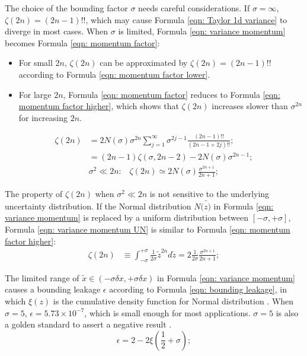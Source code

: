 \documentclass[twoside]{article}
\numberwithin{equation}{section}
\newcommand{\eqspace}{\;\;\;}
\begin{document}
The choice of the bounding factor $\sigma$ needs careful considerations.
If $\sigma = \infty$, $\zeta(2n) = (2n - 1)!!$, which may cause Formula \eqref{eqn: Taylor 1d variance} to diverge in most cases.
When $\sigma$ is limited, Formula \eqref{eqn: variance momentum} becomes Formula \eqref{eqn: momentum factor}:
\begin{itemize}
\item For small $2n$, $\zeta(2n)$ can be approximated by $\zeta(2n) = (2n-1)!!$ according to Formula \eqref{eqn: momentum factor lower}.  

\item For large $2n$, Formula \eqref{eqn: momentum factor} reduces to Formula \eqref{eqn: momentum factor higher}, which shows that $\zeta(2n)$ increases slower than $\sigma^{2n}$ for increasing $2n$.

\end{itemize}
\begin{align}
\label{eqn: momentum factor} 
\zeta(2n) &= 2 N(\sigma) \sigma^{2n} \sum_{j=1}^{\infty} \sigma^{2j-1} \frac{(2n - 1)!!}{(2n-1 + 2j)!!}; \\
\label{eqn: momentum factor lower} 
 &= (2n - 1) \zeta(\sigma, 2n - 2) - 2 N(\sigma) \sigma^{2n - 1}; \\
\label{eqn: momentum factor higher} 
&\sigma^2 \ll 2n:\eqspace \zeta(2n) \simeq 2 N(\sigma) \frac{\sigma^{2n+1}}{2n+1};
\end{align}

The property of $\zeta(2n)$ when $\sigma^2 \ll 2n$ is not sensitive to the underlying uncertainty distribution.  If the Normal distribution $N(\tilde{z)}$ in Formula \eqref{eqn: variance momentum} is replaced by a uniform distribution between $[-\sigma, +\sigma]$,  Formula \eqref{eqn: variance momentum UN} is similar to Formula \eqref{eqn: momentum factor higher}:
\begin{align}
\label{eqn: variance momentum UN}
\zeta(2n) &\equiv \int_{-\sigma}^{+\sigma} \frac{1}{2 \sigma} \tilde{z}^{2n} d \tilde{z} = 2 \frac{1}{2 \sigma} \frac{{\sigma}^{2n+1}}{2n + 1}; 
\end{align}

The limited range of $\tilde{x} \in (-\sigma \delta x, +\sigma \delta x)$ in Formula \eqref{eqn: variance momentum} causes a bounding leakage $\epsilon$ according to Formula \eqref{eqn: bounding leakage}, in which $\xi(z)$ is the cumulative density function for Normal distribution \cite{Probability_Statistics}.
When $\sigma = 5$, $\epsilon = 5.73 \times 10^{-7}$, which is small enough for most applications.
$\sigma = 5$ is also a golden standard to assert a negative result \cite{Precisions_Physical_Measurements}.
\begin{equation}
\label{eqn: bounding leakage}
\epsilon = 2 - 2 \xi(\frac{1}{2} + \sigma);
\end{equation}
\end{document}
